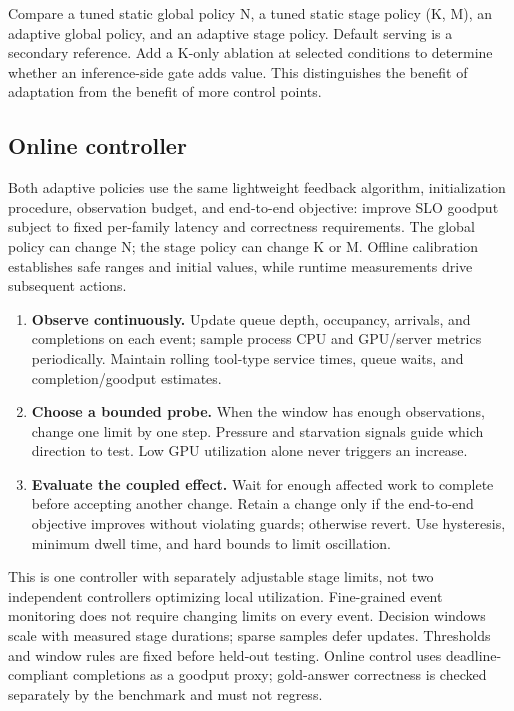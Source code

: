 \documentclass[10pt]{article}
\providecommand{\tightlist}{\setlength{\itemsep}{0pt}\setlength{\parskip}{0pt}}
\begin{document}
Compare a tuned static global policy N, a tuned static stage policy (K,
M), an adaptive global policy, and an adaptive stage policy. Default
serving is a secondary reference. Add a K-only ablation at selected
conditions to determine whether an inference-side gate adds value. This
distinguishes the benefit of adaptation from the benefit of more control
points.

\hypertarget{online-controller}{%
\subsection{Online controller}\label{online-controller}}

Both adaptive policies use the same lightweight feedback algorithm,
initialization procedure, observation budget, and end-to-end objective:
improve SLO goodput subject to fixed per-family latency and correctness
requirements. The global policy can change N; the stage policy can
change K or M. Offline calibration establishes safe ranges and initial
values, while runtime measurements drive subsequent actions.

\begin{enumerate}
\def\labelenumi{\arabic{enumi}.}
\tightlist
\item
  \textbf{Observe continuously.} Update queue depth, occupancy,
  arrivals, and completions on each event; sample process CPU and
  GPU/server metrics periodically. Maintain rolling tool-type service
  times, queue waits, and completion/goodput estimates.
\item
  \textbf{Choose a bounded probe.} When the window has enough
  observations, change one limit by one step. Pressure and starvation
  signals guide which direction to test. Low GPU utilization alone never
  triggers an increase.
\item
  \textbf{Evaluate the coupled effect.} Wait for enough affected work to
  complete before accepting another change. Retain a change only if the
  end-to-end objective improves without violating guards; otherwise
  revert. Use hysteresis, minimum dwell time, and hard bounds to limit
  oscillation.
\end{enumerate}

This is one controller with separately adjustable stage limits, not two
independent controllers optimizing local utilization. Fine-grained event
monitoring does not require changing limits on every event. Decision
windows scale with measured stage durations; sparse samples defer
updates. Thresholds and window rules are fixed before held-out testing.
Online control uses deadline-compliant completions as a goodput proxy;
gold-answer correctness is checked separately by the benchmark and must
not regress.
\end{document}
